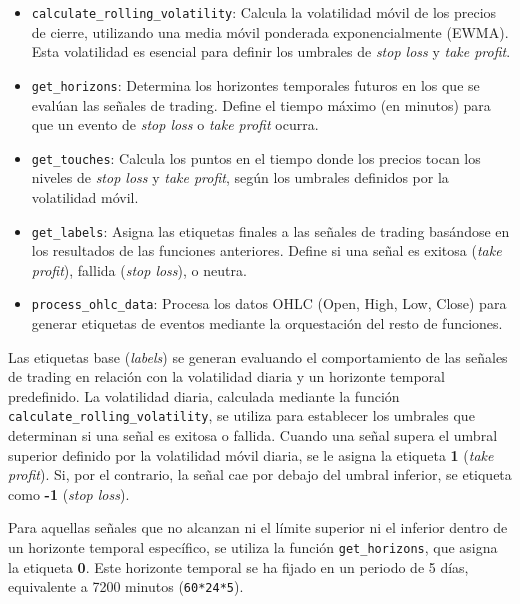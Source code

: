 \documentclass[a4paper,12pt, twoside]{report}
\begin{document}
\begin{itemize}
    
    \item \texttt{calculate\_rolling\_volatility}: Calcula la volatilidad móvil de 
    los precios de cierre, utilizando una media móvil ponderada exponencialmente (EWMA). 
    Esta volatilidad es esencial para definir los umbrales de \textit{stop loss} y 
    \textit{take profit}.
    
    \item \texttt{get\_horizons}: Determina los horizontes temporales futuros en 
    los que se evalúan las señales de trading. Define el tiempo máximo (en minutos) 
    para que un evento de \textit{stop loss} o \textit{take profit} ocurra.
    
    \item \texttt{get\_touches}: Calcula los puntos en el tiempo donde los precios 
    tocan los niveles de \textit{stop loss} y \textit{take profit}, según los 
    umbrales definidos por la volatilidad móvil.
    
    \item \texttt{get\_labels}: Asigna las etiquetas finales a las señales de 
    trading basándose en los resultados de las funciones anteriores. Define si 
    una señal es exitosa (\textit{take profit}), fallida (\textit{stop loss}), 
    o neutra.

    \item \texttt{process\_ohlc\_data}: Procesa los datos OHLC (Open, High, Low, 
    Close) para generar etiquetas de eventos mediante la orquestación del resto 
    de funciones.
    
\end{itemize}


Las etiquetas base (\textit{labels}) se generan evaluando el comportamiento de las 
señales de trading en relación con la volatilidad diaria y un horizonte temporal 
predefinido. La volatilidad diaria, calculada mediante la función 
\texttt{calculate\_rolling\_volatility}, se utiliza para establecer los umbrales 
que determinan si una señal es exitosa o fallida. Cuando una señal supera el 
umbral superior definido por la volatilidad móvil diaria, se le asigna la 
etiqueta \textbf{1} (\textit{take profit}). Si, por el contrario, la señal cae 
por debajo del umbral inferior, se etiqueta como \textbf{-1} (\textit{stop loss}).

Para aquellas señales que no alcanzan ni el límite superior ni el inferior dentro 
de un horizonte temporal específico, se utiliza la función \texttt{get\_horizons}, 
que asigna la etiqueta \textbf{0}. Este horizonte temporal se ha fijado en un 
periodo de 5 días, equivalente a 7200 minutos (\texttt{60*24*5}).
\end{document}
